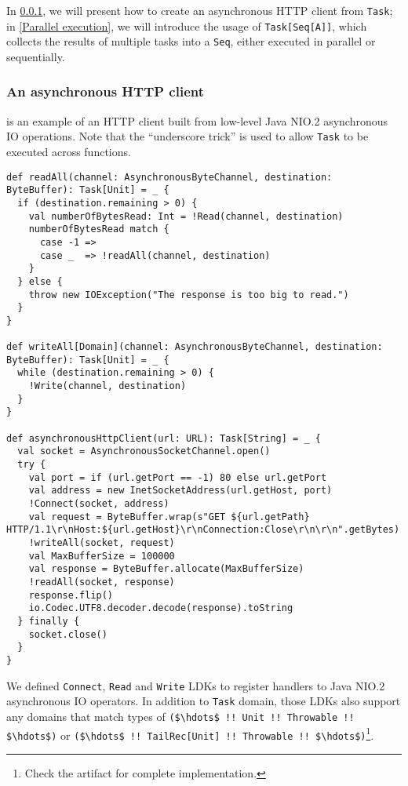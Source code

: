 In \cref{An asynchronous HTTP client}, we will present how to create an asynchronous HTTP client from \lstinline{Task}; in \cref{Parallel execution}, we will introduce the usage of \lstinline{Task[Seq[A]]}, which collects the results of multiple tasks into a \lstinline{Seq}, either executed in parallel or sequentially.

\subsubsection{An asynchronous HTTP client}\label{An asynchronous HTTP client}

 is an example of an HTTP client built from low-level Java NIO.2 asynchronous IO operations. Note that the ``underscore trick'' is used to allow \lstinline{Task} to be executed across functions.

\begin{lstlisting}[caption={An asynchronous HTTP client},label={httpClient}]
def readAll(channel: AsynchronousByteChannel, destination: ByteBuffer): Task[Unit] = _ {
  if (destination.remaining > 0) {
    val numberOfBytesRead: Int = !Read(channel, destination)
    numberOfBytesRead match {
      case -1 =>
      case _  => !readAll(channel, destination)
    }
  } else {
    throw new IOException("The response is too big to read.")
  }
}

def writeAll[Domain](channel: AsynchronousByteChannel, destination: ByteBuffer): Task[Unit] = _ {
  while (destination.remaining > 0) {
    !Write(channel, destination)
  }
}

def asynchronousHttpClient(url: URL): Task[String] = _ {
  val socket = AsynchronousSocketChannel.open()
  try {
    val port = if (url.getPort == -1) 80 else url.getPort
    val address = new InetSocketAddress(url.getHost, port)
    !Connect(socket, address)
    val request = ByteBuffer.wrap(s"GET ${url.getPath} HTTP/1.1\r\nHost:${url.getHost}\r\nConnection:Close\r\n\r\n".getBytes)
    !writeAll(socket, request)
    val MaxBufferSize = 100000
    val response = ByteBuffer.allocate(MaxBufferSize)
    !readAll(socket, response)
    response.flip()
    io.Codec.UTF8.decoder.decode(response).toString
  } finally {
    socket.close()
  }
}
\end{lstlisting}

We defined \lstinline{Connect}, \lstinline{Read} and \lstinline{Write} LDKs to register handlers to Java NIO.2 asynchronous IO operators. In addition to \lstinline{Task} domain, those LDKs also support any domains that match types of \lstinline[mathescape=true]{($\hdots$ !! Unit !! Throwable !! $\hdots$)} or \lstinline[mathescape=true]{($\hdots$ !! TailRec[Unit] !! Throwable !! $\hdots$)}\footnote{Check the artifact for complete implementation.}.

